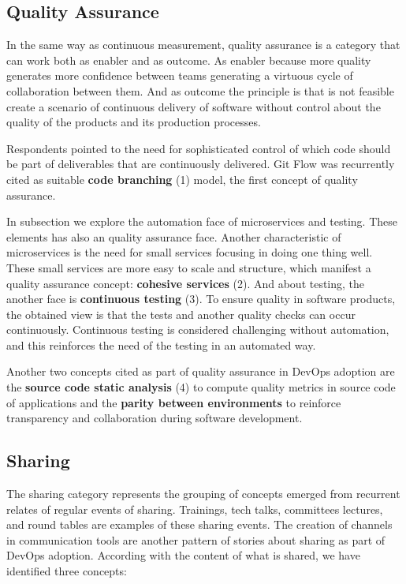 \subsection{Quality Assurance}

In the same way as continuous measurement, quality assurance is a category that
can work both as enabler and as outcome. As enabler because more quality
generates more confidence between teams generating a virtuous cycle of
collaboration between them. And as outcome the principle is that is not
feasible create a scenario of continuous delivery of software without control
about the quality of the products and its production processes.

Respondents pointed to the need for sophisticated control of which code should
be part of deliverables that are continuously delivered. Git Flow was
recurrently cited as suitable \textbf{code branching} (1) model, the first
concept of quality assurance.

In subsection \label{ssec:automation} we explore the automation face of
microservices and testing. These elements has also an quality assurance face.
Another characteristic of microservices is the need for small services focusing
in doing one thing well. These small services are more easy to scale and
structure, which manifest a quality assurance concept: \textbf{cohesive
services} (2). And about testing, the another face is \textbf{continuous
testing} (3). To ensure quality in software products, the obtained view is that
the tests and another quality checks can occur continuously. Continuous testing
is considered challenging without automation, and this reinforces the need of
the testing in an automated way.

Another two concepts cited as part of quality assurance in DevOps adoption are
the \textbf{source code static analysis} (4) to compute quality metrics in
source code of applications and the \textbf{parity between environments} to
reinforce transparency and collaboration during software development.

\subsection{Sharing}

The sharing category represents the grouping of concepts emerged from recurrent
relates of regular events of sharing. Trainings, tech talks, committees
lectures, and round tables are examples of these sharing events. The creation
of channels in communication tools are another pattern of stories about sharing
as part of DevOps adoption. According with the content of what is shared, we
have identified three concepts:

